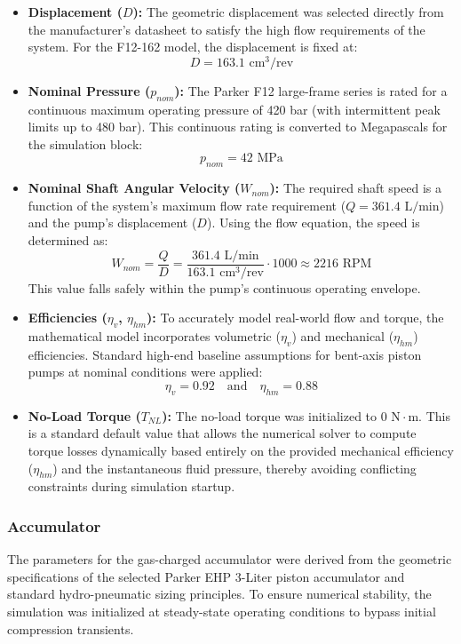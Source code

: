 \documentclass[
bindingoffset=5mm,  %
footnoteindent=3mm, %
hyphenation=true    %
]{src/wut-thesis}
\begin{document}
	\begin{itemize}
		\item \textbf{Displacement ($D$):} The geometric displacement was selected directly from the manufacturer's datasheet to satisfy the high flow requirements of the system. For the F12-162 model, the displacement is fixed at:
		$$D = 163.1 \text{ cm}^3/\text{rev}$$
		
		\item \textbf{Nominal Pressure ($p_{nom}$):} The Parker F12 large-frame series is rated for a continuous maximum operating pressure of 420 bar (with intermittent peak limits up to 480 bar). This continuous rating is converted to Megapascals for the simulation block:
		$$p_{nom} = 42 \text{ MPa}$$
		
		\item \textbf{Nominal Shaft Angular Velocity ($W_{nom}$):} The required shaft speed is a function of the system's maximum flow rate requirement ($Q = 361.4 \text{ L/min}$) and the pump's displacement ($D$). Using the flow equation, the speed is determined as:
		$$W_{nom} = \frac{Q}{D} = \frac{361.4 \text{ L/min}}{163.1 \text{ cm}^3/\text{rev}} \cdot 1000 \approx 2216 \text{ RPM}$$
		This value falls safely within the pump's continuous operating envelope.
		
		\item \textbf{Efficiencies ($\eta_v$, $\eta_{hm}$):} To accurately model real-world flow and torque, the mathematical model incorporates volumetric ($\eta_v$) and mechanical ($\eta_{hm}$) efficiencies. Standard high-end baseline assumptions for bent-axis piston pumps at nominal conditions were applied:
		$$\eta_v = 0.92 \quad \text{and} \quad \eta_{hm} = 0.88$$
		
		\item \textbf{No-Load Torque ($T_{NL}$):} The no-load torque was initialized to $0 \text{ N}\cdot\text{m}$. This is a standard default value that allows the numerical solver to compute torque losses dynamically based entirely on the provided mechanical efficiency ($\eta_{hm}$) and the instantaneous fluid pressure, thereby avoiding conflicting constraints during simulation startup.
	\end{itemize}
	
	\subsubsection{Accumulator}
	
	The parameters for the gas-charged accumulator were derived from the geometric specifications of the selected Parker EHP 3-Liter piston accumulator and standard hydro-pneumatic sizing principles. To ensure numerical stability, the simulation was initialized at steady-state operating conditions to bypass initial compression transients.
	
\end{document}
